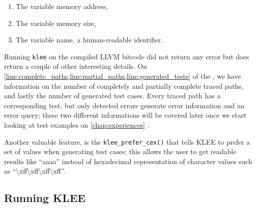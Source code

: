 \begin{enumerate}
    \item The variable memory address,
    \item The variable memory size,
    \item The variable name, a human-readable identifier.
\end{enumerate}

Running \lstinline$klee$ on the compiled LLVM bitcode did not return any error but does return a couple of other interesting details. On \cref{line:complete_paths,line:partial_paths,line:generated_tests} of the , we have information on the number of completely and partially complete traced paths, and lastly the number of generated test cases. Every traced path has a corresponding test, but only detected errors generate error information and an error query; these two different informations will be covered later once we start looking at test examples on \cref{chap:experiences} .



\noindent\begin{minipage}{\linewidth}

\end{minipage}

Another valuable feature, is the \lstinline$klee_prefer_cex()$ that tells KLEE to prefer a set of values when generating test cases; this allows the user to get readable results like ``aaaa'' instead of hexadecimal representation of character values such as ``\textbackslash xff\textbackslash xff\textbackslash xff\textbackslash xff''.

\subsection{Running KLEE}\label{subsection:running_klee}


